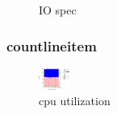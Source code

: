 \documentclass[11pt,a4paper]{jsarticle}
\newlength{\subfigwidth}
\newlength{\subfigcolsep}
\begin{document}
\begin{figure}[thbp]
 \setlength{\subfigwidth}{.5\linewidth}
 \addtolength{\subfigwidth}{-.5\subfigcolsep}
 \begin{minipage}[b]{\subfigwidth}
 \end{minipage}
  \begin{minipage}[b]{\subfigwidth}
  \end{minipage}
  \caption{IO spec}
  \label{fig:8}
\end{figure}

\clearpage
\subsubsection*{countlineitem}
\begin{figure}[thbp]
 \begin{center}
  \includegraphics[width=10mm]{swapoffcountlineitemcore1.eps}
 \end{center}
 \caption{cpu utilization}
 \label{fig:9cpu}
\end{figure}
\end{document}
